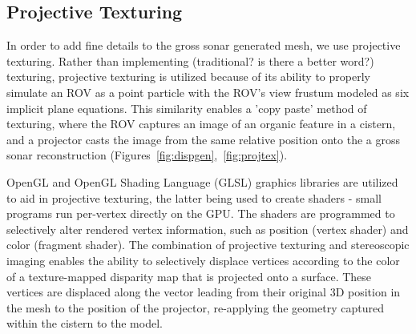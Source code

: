 \documentclass[a4paper,twoside]{article}
\begin{document}
\subsection{Projective Texturing}
\label{subsec:projectiveTexturing}




\noindent In order to add fine details to the gross sonar generated mesh, we use projective texturing. Rather than implementing (traditional? is there a better word?) texturing, projective texturing is utilized because of its ability to properly simulate an ROV as a point particle with the ROV's view frustum modeled as six implicit plane equations. This similarity enables a 'copy paste' method of texturing, where the ROV captures an image of an organic feature in a cistern, and a projector casts the image from the same relative position onto the a gross sonar reconstruction (Figures~\ref{fig:dispgen},~\ref{fig:projtex}). 

OpenGL and OpenGL Shading Language (GLSL) graphics libraries are utilized to aid in projective texturing, the latter being used to create shaders - small programs run per-vertex directly on the GPU. The shaders are programmed to selectively alter rendered vertex information, such as position (vertex shader) and color (fragment shader). The combination of projective texturing and stereoscopic imaging enables the ability to selectively displace vertices according to the color of a texture-mapped disparity map that is projected onto a surface. These vertices are displaced along the vector leading from their original 3D position in the mesh to the position of the projector, re-applying the geometry captured within the cistern to the model.
\end{document}
